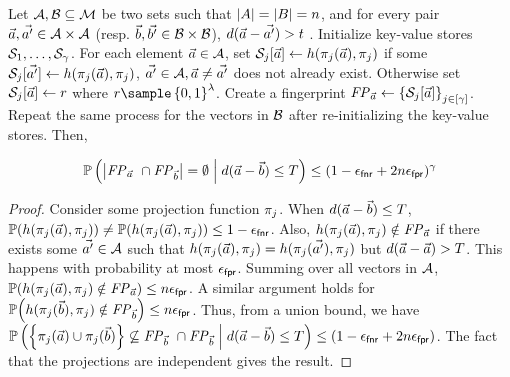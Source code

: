 \begin{prop}
\label{thm:prob_match}
Let $\setNotation{A}, \setNotation{B} \subseteq \metricSpace$ be two sets such that $\left|{A}\right| = \left|{B}\right| = n$, and for every pair $\vec{a}, \vec{a'} \in \setNotation{A} \times \setNotation{A}$ (resp. $\vec{b}, \vec{b'} \in \setNotation{B} \times \setNotation{B}$), $\distanceNotation[\distance][\vec{a} - \vec{a'}] > t$ 
. Initialize \numProjections key-value stores $\projBuckets[1], \dots, \projBuckets[\numProjections]$. For each element $\vec{a} \in \setNotation{A}$, set $\projBuckets[\projIdx][\vec{a}] \assign \hashFn(\projFn[\projIdx](\vec{a}), \projFn[\projIdx])$ if some $\projBuckets[\projIdx][\vec{a'}] \assign \hashFn(\projFn[\projIdx](\vec{a}), \projFn[\projIdx])$, $\vec{a'} \in \setNotation{A}, \vec{a} \neq \vec{a'}$ does not already exist. Otherwise set $\projBuckets[\projIdx][\vec{a}] \assign \genericRand$ where $\genericRand \getsr \setDefn{0,1}^{\secParam}$. Create a fingerprint $\fingerprint{\vec{a}} \gets \setDefn{\projBuckets[\projIdx][\vec{a}]}_{\projIdx \in \nats[\numProjections]}$. Repeat the same process for the vectors in $\setNotation{B}$ after re-initializing the key-value stores. Then, 

\[
\cprob{}{\setSize{\fingerprint{\vec{a}} ~\cap \fingerprint{\vec{b}}} = \emptyset}{\distanceNotation[\distance][\vec{a} - \vec{b}] \le \threshold} \le (1 - \fnr + 2\blocklistSize \fpr)^{\numProjections}
\]
\end{prop}

\begin{proof}
Consider some projection function $\projFn[\projIdx]$. When $\distanceNotation[\distance][\vec{a} - \vec{b}] \le \threshold$, $\prob{\hashFn(\projFn[\projIdx](\vec{a}), \projFn[\projIdx])} \neq \prob{\hashFn(\projFn[\projIdx](\vec{a}), \projFn[\projIdx])} \le 1 - \fnr$. Also, $\hashFn(\projFn[\projIdx](\vec{a}), \projFn[\projIdx]) \notin \fingerprint{\vec{a}}$ if there exists some $\vec{a'} \in \setNotation{A}$ such that $\hashFn(\projFn[\projIdx](\vec{a}), \projFn[\projIdx]) = \hashFn(\projFn[\projIdx](\vec{a'}), \projFn[\projIdx])$ but $\distanceNotation[\distance][\vec{a} - \vec{a}] > \threshold$. This happens with probability at most $\epsilon_\mathsf{fpr}$. Summing over all vectors in $\setNotation{A}$, $\prob{\hashFn(\projFn[\projIdx](\vec{a}), \projFn[\projIdx]) \notin \fingerprint{\vec{a}}} \le \blocklistSize \fpr$. A similar argument holds for $\prob{\hashFn(\projFn[\projIdx](\vec{b}), \projFn[\projIdx]) \notin \fingerprint{\vec{b}}} \le \blocklistSize \fpr$. Thus, from a union bound, we have $\cprob{}{\setDefn{\projFn[\projIdx](\vec{a}) \cup \projFn[\projIdx](\vec{b})} \not\subseteq \fingerprint{\vec{b}} ~\cap \fingerprint{\vec{b}}}{\distanceNotation[\distance][\vec{a} - \vec{b}] \le \threshold} \le (1 - \fnr + 2\blocklistSize \fpr)$. The fact that the projections are independent gives the result. 
\end{proof}


